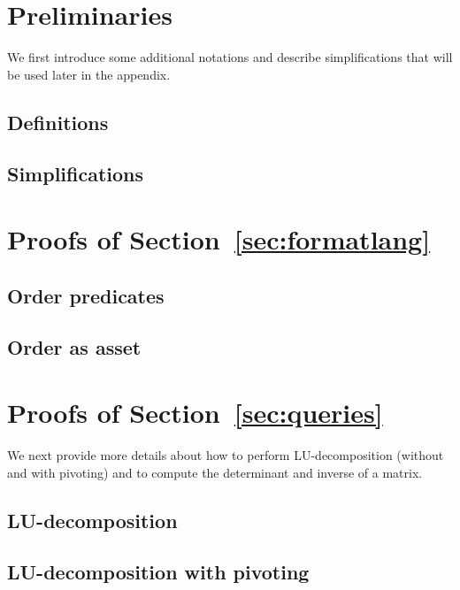 
\section{Preliminaries}
We first introduce some additional notations and describe simplifications that will be used later in the appendix.
\subsection{Definitions}
\label{app:def}

\subsection{Simplifications}\label{app:simp}



\section{Proofs of Section~\ref{sec:formatlang}}

\subsection{Order predicates}\label{app:order}

\subsection{Order as asset}\label{app:asset_order}



\section{Proofs of Section~\ref{sec:queries}}
We next provide more details about how to perform LU-decomposition (without and with pivoting)
and to compute the determinant and inverse of a matrix.
\subsection{LU-decomposition}


\subsection{LU-decomposition with pivoting}


